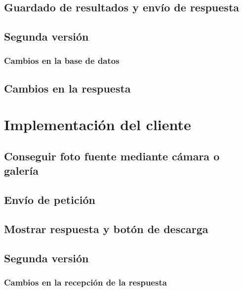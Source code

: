 \subsection{Guardado de resultados y envío de respuesta}

\subsection{Segunda versión}

\subsubsection{Cambios en la base de datos}

\subsection{Cambios en la respuesta}

\section{Implementación del cliente}

\subsection{Conseguir foto fuente mediante cámara o galería}

\subsection{Envío de petición}

\subsection{Mostrar respuesta y botón de descarga}

\subsection{Segunda versión}

\subsubsection{Cambios en la recepción de la respuesta}


